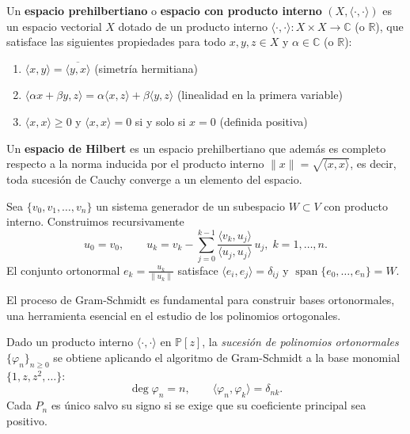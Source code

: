 \begin{definition}\label{def:prehilbert_space}
	Un \textbf{espacio prehilbertiano} o \textbf{espacio con producto interno} $(X, \langle \cdot, \cdot \rangle)$ es un espacio vectorial $X$ dotado de un producto interno $\langle \cdot, \cdot \rangle: X \times X \rightarrow \mathbb{C}$ (o $\mathbb{R}$), que satisface las siguientes propiedades para todo $x, y, z \in X$ y $\alpha \in \mathbb{C}$ (o $\mathbb{R}$):
	\begin{enumerate}
		\item $\langle x, y \rangle = \overline{\langle y, x \rangle}$ (simetría hermitiana)
		\item $\langle \alpha x + \beta y, z \rangle = \alpha \langle x, z \rangle + \beta \langle y, z \rangle$ (linealidad en la primera variable)
		\item $\langle x, x \rangle \geq 0$ y $\langle x, x \rangle = 0$ si y solo si $x = 0$ (definida positiva)
	\end{enumerate}

	Un \textbf{espacio de Hilbert} es un espacio prehilbertiano que además es completo respecto a la norma inducida por el producto interno $\|x\| = \sqrt{\langle x, x \rangle}$, es decir, toda sucesión de Cauchy converge a un elemento del espacio.
\end{definition}

\begin{definition}\label{def:gram-schmidt}
	Sea $\{v_0,v_1,\dots,v_n\}$ un sistema generador de un
	subespacio $W\subset V$ con producto interno.
	Construimos recursivamente
	\[
		u_0=v_0,\qquad
		u_k= v_k-\sum_{j=0}^{k-1}
		\frac{\langle v_k,u_j\rangle}{\langle u_j,u_j\rangle}\,u_j,
		\;k=1,\dots,n.
	\]
	El conjunto ortonormal
	$\displaystyle e_k=\frac{u_k}{\|u_k\|}$ satisface
	$\langle e_i,e_j\rangle=\delta_{ij}$ y
	$\operatorname{span}\{e_0,\dots,e_n\}=W$.
\end{definition}

El proceso de Gram-Schmidt es fundamental para construir bases ortonormales, una herramienta esencial en el estudio de los polinomios ortogonales.

Dado un producto interno $\langle\cdot,\cdot\rangle$ en $\mathbb{P}[z]$,
la \emph{sucesión de polinomios ortonormales}
$\{\varphi_n\}_{n\ge 0}$ se obtiene aplicando
el algoritmo de Gram-Schmidt a la base monomial $\{1,z,z^2,\dots\}$:
\[
	\deg \varphi_n=n,\qquad
	\langle \varphi_n,\varphi_k\rangle=\delta_{nk}.
\]
Cada $P_n$ es único salvo su signo si se exige que su coeficiente principal sea positivo.


